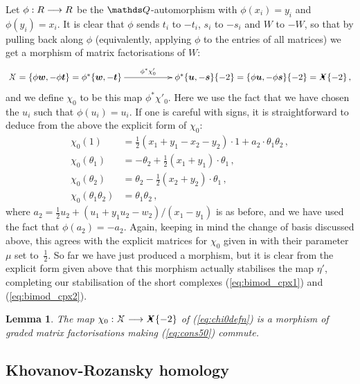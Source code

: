 \documentclass{compositio}
\newtheorem{lemma}[theorem]{Lemma}
\theoremstyle{definition}
\numberwithin{equation}{section}
\begin{document}
Let $\phi: R \longrightarrow R$ be the $\nQ$-automorphism with $\phi(x_i) = y_i$ and $\phi(y_i) = x_i$. It is clear that $\phi$ sends $t_i$ to $-t_i$, $s_i$ to $-s_i$ and $W$ to $-W$, so that by pulling back along $\phi$ (equivalently, applying $\phi$ to the entries of all matrices) we get a morphism of matrix factorisations of $W$: 
\[
\xymatrix{
\Xcirc = \{ \phi\bs{w}, -\phi \bs{t} \} = \phi^*\{ \bs{w}, -\bs{t} \} \ar[rr]^-{\phi^* \chi'_0} & & \phi^*\{ \bs{u}, -\bs{s} \}\{-2\} = \{ \phi \bs{u}, -\phi \bs{s} \}\{-2\} = \Xbul\{-2\} \, ,
}
\]
and we define $\chi_0$ to be this map $\phi^* \chi'_0$. Here we use the fact that we have chosen the $u_i$ such that $\phi(u_i) = u_i$. If one is careful with signs, it is straightforward to deduce from the above the explicit form of $\chi_0$:
\begin{align}
\chi_0(1) &= \frac{1}{2}(x_1 + y_1 - x_2 - y_2) \cdot 1 + a_2 \cdot \theta_1 \theta_2 \, ,\nonumber \\
\chi_0(\theta_1) &= -\theta_2 + \frac{1}{2}(x_1 + y_1) \cdot \theta_1\, ,\nonumber \\
\chi_0(\theta_2) &= \theta_2 - \frac{1}{2}(x_2 + y_2) \cdot \theta_1\, , \nonumber \\
\chi_0(\theta_1\theta_2) &= \theta_1\theta_2\,, \label{eq:chi0defn}
\end{align}
where $a_2 = \frac{1}{2}u_2 + (u_1 + y_1 u_2 - w_2)/(x_1-y_1)$ is as before, and we have used the fact that $\phi(a_2) = -a_2$. Again, keeping in mind the change of basis discussed above, this agrees with the explicit matrices for $\chi_0$ given in \cite[Section~6]{kr0401268} with their parameter~$\mu$ set to~$\frac{1}{2}$. So far we have just produced a morphism, but it is clear from the explicit form given above that this morphism actually stabilises the map $\eta'$, completing our stabilisation of the short complexes (\ref{eq:bimod_cpx1}) and (\ref{eq:bimod_cpx2}).

\begin{lemma} The map $\chi_0: \Xcirc \lto \Xbul\{-2\}$ of (\ref{eq:chi0defn}) is a morphism of graded matrix factorisations making (\ref{eq:cons50}) commute.
\end{lemma}

\subsection{Khovanov-Rozansky homology}
\end{document}
